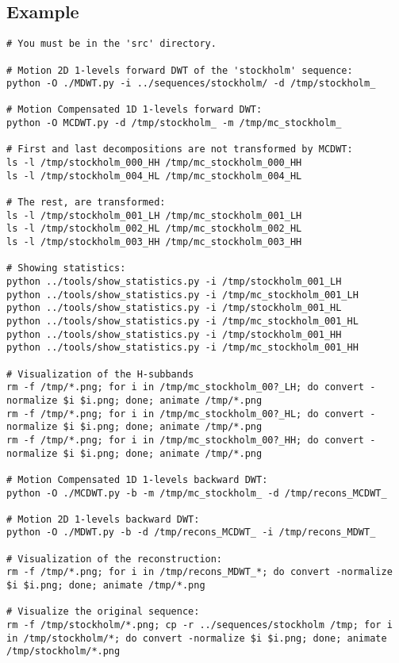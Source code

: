 \subsection{Example}
\begin{verbatim}
# You must be in the 'src' directory.

# Motion 2D 1-levels forward DWT of the 'stockholm' sequence:
python -O ./MDWT.py -i ../sequences/stockholm/ -d /tmp/stockholm_

# Motion Compensated 1D 1-levels forward DWT:
python -O MCDWT.py -d /tmp/stockholm_ -m /tmp/mc_stockholm_

# First and last decompositions are not transformed by MCDWT:
ls -l /tmp/stockholm_000_HH /tmp/mc_stockholm_000_HH
ls -l /tmp/stockholm_004_HL /tmp/mc_stockholm_004_HL

# The rest, are transformed:
ls -l /tmp/stockholm_001_LH /tmp/mc_stockholm_001_LH
ls -l /tmp/stockholm_002_HL /tmp/mc_stockholm_002_HL
ls -l /tmp/stockholm_003_HH /tmp/mc_stockholm_003_HH

# Showing statistics:
python ../tools/show_statistics.py -i /tmp/stockholm_001_LH
python ../tools/show_statistics.py -i /tmp/mc_stockholm_001_LH
python ../tools/show_statistics.py -i /tmp/stockholm_001_HL
python ../tools/show_statistics.py -i /tmp/mc_stockholm_001_HL
python ../tools/show_statistics.py -i /tmp/stockholm_001_HH
python ../tools/show_statistics.py -i /tmp/mc_stockholm_001_HH

# Visualization of the H-subbands
rm -f /tmp/*.png; for i in /tmp/mc_stockholm_00?_LH; do convert -normalize $i $i.png; done; animate /tmp/*.png
rm -f /tmp/*.png; for i in /tmp/mc_stockholm_00?_HL; do convert -normalize $i $i.png; done; animate /tmp/*.png
rm -f /tmp/*.png; for i in /tmp/mc_stockholm_00?_HH; do convert -normalize $i $i.png; done; animate /tmp/*.png

# Motion Compensated 1D 1-levels backward DWT:
python -O ./MCDWT.py -b -m /tmp/mc_stockholm_ -d /tmp/recons_MCDWT_

# Motion 2D 1-levels backward DWT:
python -O ./MDWT.py -b -d /tmp/recons_MCDWT_ -i /tmp/recons_MDWT_

# Visualization of the reconstruction:
rm -f /tmp/*.png; for i in /tmp/recons_MDWT_*; do convert -normalize $i $i.png; done; animate /tmp/*.png

# Visualize the original sequence:
rm -f /tmp/stockholm/*.png; cp -r ../sequences/stockholm /tmp; for i in /tmp/stockholm/*; do convert -normalize $i $i.png; done; animate /tmp/stockholm/*.png
\end{verbatim}


